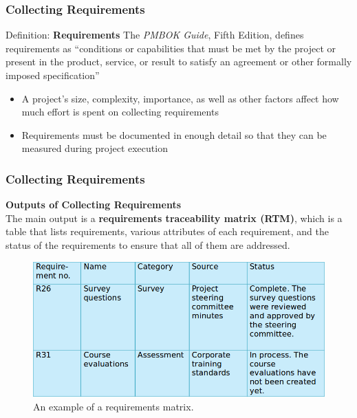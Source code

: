 \documentclass{beamer}
\begin{document}
\begin{frame}
\frametitle{Collecting Requirements}
\vspace{0.5cm}
\begin{block}{Definition: \textbf{Requirements}}
The \textit{PMBOK Guide}, Fifth Edition, defines requirements as “conditions or capabilities that must be met by the project or present in the product, service, or result to satisfy an agreement or other formally imposed specification”
\end{block}
\vspace{0.3cm}
\begin{itemize}
\item A project’s size, complexity, importance, as well as other factors affect how much effort is spent on collecting requirements
\vspace{0.5cm}
\item Requirements must be documented in enough detail so that they can be measured during project execution
\end{itemize}
\end{frame}


\begin{frame}
\frametitle{Collecting Requirements}
\textbf{Outputs of Collecting Requirements}\\
\vspace{0.5cm}
The main output is a \textbf{requirements traceability matrix (RTM)}, which is a table that lists requirements, various attributes of each requirement, and the status of the requirements to ensure that all of them are addressed.
\vspace{0.3cm}
\begin{figure}
\includegraphics[scale=0.35]{requirements_mat}
\caption{An example of a requirements matrix.}
\end{figure}
\end{frame}
\end{document}
